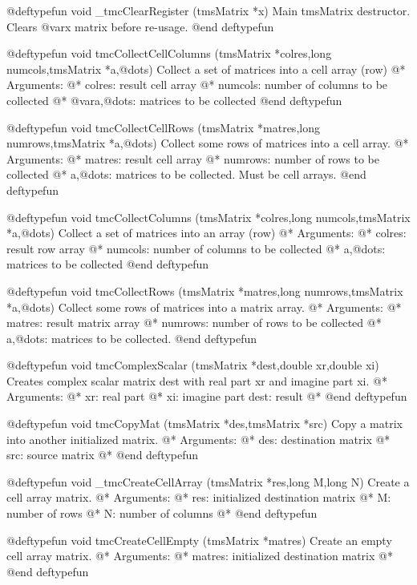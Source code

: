 @deftypefun void  _tmcClearRegister (tmsMatrix *x) 
Main tmsMatrix destructor. Clears @var{x} matrix before re-usage.
@end deftypefun


@deftypefun  void tmcCollectCellColumns (tmsMatrix *colres,long numcols,tmsMatrix *a,@dots{})
Collect a set of matrices into a cell array (row) @*
Arguments: @*
	colres: result cell array @*
	numcols: number of columns to be collected @*
	@var{a},@dots{}: matrices to be collected
@end deftypefun



@deftypefun         void tmcCollectCellRows (tmsMatrix *matres,long numrows,tmsMatrix *a,@dots{})
Collect some rows of matrices into a cell array. @*
Arguments: @*
	matres: result cell array @*
	numrows: number of rows to be collected @*
	a,@dots{}: matrices to be collected. Must be cell arrays.
@end deftypefun



@deftypefun         void tmcCollectColumns (tmsMatrix *colres,long numcols,tmsMatrix *a,@dots{})
Collect a set of matrices into an array (row) @*
Arguments: @*
	colres: result row array @*
	numcols: number of columns to be collected @*
	a,@dots{}: matrices to be collected
@end deftypefun



@deftypefun         void tmcCollectRows (tmsMatrix *matres,long numrows,tmsMatrix *a,@dots{})
Collect some rows of matrices into a matrix array. @*
Arguments: @*
	matres: result matrix array @*
	numrows: number of rows to be collected @*
	a,@dots{}: matrices to be collected.
@end deftypefun

@deftypefun         void tmcComplexScalar (tmsMatrix *dest,double xr,double xi)
Creates complex scalar matrix dest with real part xr and 
imagine part xi. @*
Arguments: @*
	xr: real part @*
	xi: imagine part
	dest: result @*
@end deftypefun


@deftypefun         void tmcCopyMat (tmsMatrix *des,tmsMatrix *src)
Copy a matrix into another initialized matrix. @*
Arguments: @*
	des: destination matrix @*
	src: source matrix @*
@end deftypefun


@deftypefun         void _tmcCreateCellArray (tmsMatrix *res,long M,long N)
Create a cell array matrix. @*
Arguments: @*
	res: initialized destination matrix @*
	M: number of rows @*
	N: number of columns @*
@end deftypefun



@deftypefun           void tmcCreateCellEmpty (tmsMatrix *matres)
Create an empty cell array matrix. @*
Arguments: @*
	matres: initialized destination matrix @*
@end deftypefun



